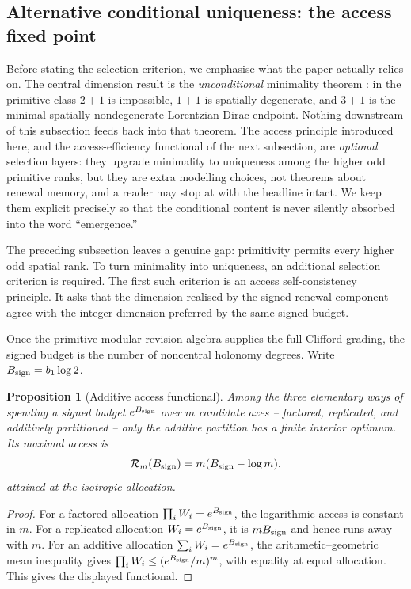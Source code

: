 \documentclass[11pt]{article}
\newtheorem{proposition}[theorem]{Proposition}
\theoremstyle{definition}
\theoremstyle{remark}
\newcommand{\Acc}{\mathcal{R}}
\begin{document}
\subsection{Alternative conditional uniqueness: the access fixed point}
\label{subsec:access-selection-main}

Before stating the selection criterion, we emphasise what the paper actually
relies on.  The central dimension result is the \emph{unconditional}
minimality theorem : in the primitive
class \(2+1\) is impossible, \(1+1\) is spatially degenerate, and \(3+1\) is the
minimal spatially nondegenerate Lorentzian Dirac endpoint.  Nothing downstream of
this subsection feeds back into that theorem.  The access principle introduced
here, and the access-efficiency functional of the next subsection, are
\emph{optional} selection layers: they upgrade minimality to uniqueness among the
higher odd primitive ranks, but they are extra modelling choices, not theorems
about renewal memory, and a reader may stop at
 with the headline intact.  We keep them
explicit precisely so that the conditional content is never silently absorbed
into the word ``emergence.''

The preceding subsection leaves a genuine gap: primitivity permits every higher
odd spatial rank.  To turn minimality into uniqueness, an additional selection
criterion is required.  The first such criterion is an access
self-consistency principle.  It asks that the dimension realised by the signed
renewal component agree with the integer dimension preferred by the same signed
budget.

Once the primitive modular revision algebra supplies the full Clifford grading,
the signed budget is the number of noncentral holonomy degrees.  Write
\(B_{\rm sign}=b_1\log2\).

\begin{proposition}[Additive access functional]
\label{prop:additive-access-main}
Among the three elementary ways of spending a signed budget \(e^{B_{\rm sign}}\)
over \(m\) candidate axes -- factored, replicated, and additively partitioned --
only the additive partition has a finite interior optimum.  Its maximal access is
\[
  \Acc_m(B_{\rm sign})=m(B_{\rm sign}-\log m),
\]
attained at the isotropic allocation.
\end{proposition}

\begin{proof}
For a factored allocation \(\prod_i W_i=e^{B_{\rm sign}}\), the logarithmic
access is constant in \(m\).  For a replicated allocation \(W_i=e^{B_{\rm sign}}\),
it is \(mB_{\rm sign}\) and hence runs away with \(m\).  For an additive
allocation \(\sum_iW_i=e^{B_{\rm sign}}\), the arithmetic--geometric mean
inequality gives \(\prod_iW_i\le(e^{B_{\rm sign}}/m)^m\), with equality at equal
allocation.  This gives the displayed functional.
\end{proof}
\end{document}

